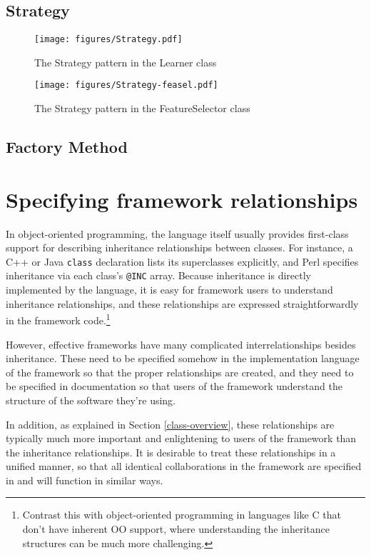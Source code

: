 \subsection{Strategy}
\label{Strategy}
\begin{figure}
\texttt{[image: figures/Strategy.pdf]}
\caption{The Strategy pattern in the Learner class}
\label{Strategy-learner}
\end{figure}

\begin{figure}
\texttt{[image: figures/Strategy-feasel.pdf]}
\caption{The Strategy pattern in the FeatureSelector class}
\label{Strategy-feasel}
\end{figure}

\subsection{Factory Method}

\section{Specifying framework relationships}

In object-oriented programming, the language itself usually provides
first-class support for describing inheritance relationships between
classes.  For instance, a C++ or Java \texttt{class} declaration lists
its superclasses explicitly, and Perl specifies inheritance via each
class's \texttt{@INC} array.  Because inheritance is directly
implemented by the language, it is easy for framework users to
understand inheritance relationships, and these relationships are
expressed straightforwardly in the framework code.\footnote{Contrast
this with object-oriented programming in languages like C that don't
have inherent OO support, where understanding the inheritance
structures can be much more challenging.\cite[p. 7]{fayad:99}}

However, effective frameworks have many complicated interrelationships
besides inheritance.  These need to be specified somehow in the
implementation language of the framework so that the proper
relationships are created, and they need to be specified in
documentation so that users of the framework understand the structure
of the software they're using.

In addition, as explained in Section \ref{class-overview}, these
relationships are typically much more important and enlightening to
users of the framework than the inheritance relationships.  It is
desirable to treat these relationships in a unified manner, so that
all identical collaborations in the framework are specified in and
will function in similar ways.\cite[p. 13]{fayad:99}

